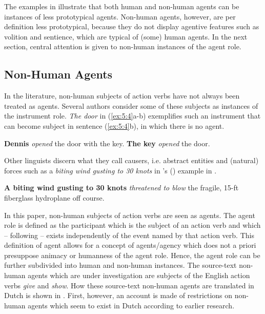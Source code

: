 \documentclass[output=paper]{LSP/langsci}
\begin{document}

The examples in  illustrate that both human and non-human agents can be instances of less prototypical agents. Non-human agents, however, are per definition less prototypical, because they do not display agentive features such as volition and sentience, which are typical of (some) human agents. In the next section, central attention is given to non-human instances of the agent role.

\subsection{Non-Human Agents} \label{sec:5:2:2}

In the literature, non-human subjects of action verbs have not always been treated as agents. Several authors \citep[see e.g.][]{Fillmore1968,Quirk1972,Levin1993} consider some of these subjects as instances of the instrument role. \textit{The door} in (\ref{ex:5:4}a-b) exemplifies such an instrument that can become subject in sentence (\ref{ex:5:4}b), in which there is no agent.

\ea \label{ex:5:4}
\ea \textbf{Dennis} \textit{opened} the door with the key.
\ex \textbf{The key} \textit{opened} the door. 
\z
\z

Other linguists \citep[see e.g.][]{Biber1999,Talmy2000} discern what they call causers, i.e. abstract entities and (natural) forces such as a \textit{biting wind gusting to 30 knots} in \citeauthor{Biber1999}’s (\citeyear{Biber1999}) example in .

\ea \label{ex:5:5}
\ea \textbf{A biting wind gusting to 30 knots} \textit{threatened to blow} the fragile, 15-ft fiberglass hydroplane off course.
\z
\z

In this paper, non-human subjects of action verbs are seen as agents. The agent role is defined as the participant which is the subject of an action verb and which – following \citet{Dowty1991} – exists independently of the event named by that action verb. This definition of agent allows for a concept of agents/agency which does not a priori presuppose animacy or humanness of the agent role. Hence, the agent role can be further subdivided into human and non-human instances. The source-text non-human agents which are under investigation are subjects of the English action verbs \textit{give} and \textit{show}. How these source-text non-human agents are translated in Dutch is shown in . First, however, an account is made of restrictions on non-human agents which seem to exist in Dutch according to earlier research.
\end{document}
